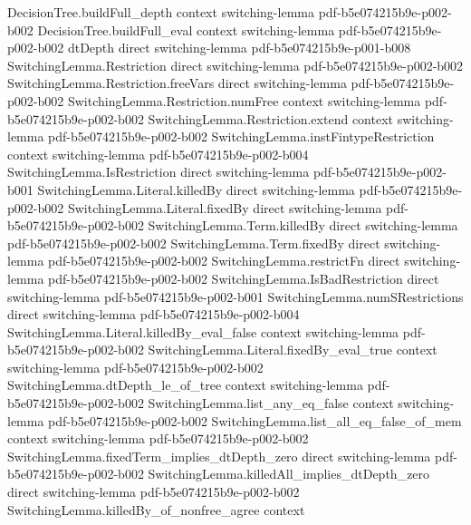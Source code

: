 \begin{theorem}
\proofstep
  {DecisionTree.buildFull_depth}
  {context}
  {switching-lemma}
  {pdf-b5e074215b9e-p002-b002}
\proofstep
  {DecisionTree.buildFull_eval}
  {context}
  {switching-lemma}
  {pdf-b5e074215b9e-p002-b002}
\proofstep
  {dtDepth}
  {direct}
  {switching-lemma}
  {pdf-b5e074215b9e-p001-b008}
\proofstep
  {SwitchingLemma.Restriction}
  {direct}
  {switching-lemma}
  {pdf-b5e074215b9e-p002-b002}
\proofstep
  {SwitchingLemma.Restriction.freeVars}
  {direct}
  {switching-lemma}
  {pdf-b5e074215b9e-p002-b002}
\proofstep
  {SwitchingLemma.Restriction.numFree}
  {context}
  {switching-lemma}
  {pdf-b5e074215b9e-p002-b002}
\proofstep
  {SwitchingLemma.Restriction.extend}
  {context}
  {switching-lemma}
  {pdf-b5e074215b9e-p002-b002}
\proofstep
  {SwitchingLemma.instFintypeRestriction}
  {context}
  {switching-lemma}
  {pdf-b5e074215b9e-p002-b004}
\proofstep
  {SwitchingLemma.IsRestriction}
  {direct}
  {switching-lemma}
  {pdf-b5e074215b9e-p002-b001}
\proofstep
  {SwitchingLemma.Literal.killedBy}
  {direct}
  {switching-lemma}
  {pdf-b5e074215b9e-p002-b002}
\proofstep
  {SwitchingLemma.Literal.fixedBy}
  {direct}
  {switching-lemma}
  {pdf-b5e074215b9e-p002-b002}
\proofstep
  {SwitchingLemma.Term.killedBy}
  {direct}
  {switching-lemma}
  {pdf-b5e074215b9e-p002-b002}
\proofstep
  {SwitchingLemma.Term.fixedBy}
  {direct}
  {switching-lemma}
  {pdf-b5e074215b9e-p002-b002}
\proofstep
  {SwitchingLemma.restrictFn}
  {direct}
  {switching-lemma}
  {pdf-b5e074215b9e-p002-b002}
\proofstep
  {SwitchingLemma.IsBadRestriction}
  {direct}
  {switching-lemma}
  {pdf-b5e074215b9e-p002-b001}
\proofstep
  {SwitchingLemma.numSRestrictions}
  {direct}
  {switching-lemma}
  {pdf-b5e074215b9e-p002-b004}
\proofstep
  {SwitchingLemma.Literal.killedBy_eval_false}
  {context}
  {switching-lemma}
  {pdf-b5e074215b9e-p002-b002}
\proofstep
  {SwitchingLemma.Literal.fixedBy_eval_true}
  {context}
  {switching-lemma}
  {pdf-b5e074215b9e-p002-b002}
\proofstep
  {SwitchingLemma.dtDepth_le_of_tree}
  {context}
  {switching-lemma}
  {pdf-b5e074215b9e-p002-b002}
\proofstep
  {SwitchingLemma.list_any_eq_false}
  {context}
  {switching-lemma}
  {pdf-b5e074215b9e-p002-b002}
\proofstep
  {SwitchingLemma.list_all_eq_false_of_mem}
  {context}
  {switching-lemma}
  {pdf-b5e074215b9e-p002-b002}
\proofstep
  {SwitchingLemma.fixedTerm_implies_dtDepth_zero}
  {direct}
  {switching-lemma}
  {pdf-b5e074215b9e-p002-b002}
\proofstep
  {SwitchingLemma.killedAll_implies_dtDepth_zero}
  {direct}
  {switching-lemma}
  {pdf-b5e074215b9e-p002-b002}
\proofstep
  {SwitchingLemma.killedBy_of_nonfree_agree}
  {context}

\end{theorem}
